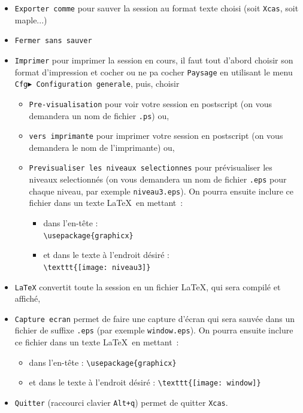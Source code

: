 \documentclass[a4paper,11pt]{article}
\begin{document}
\begin{itemize}
{\tt Sauver tout} pour sauver tout votre espace de travail 
c'est \`a dire toutes les sessions dans un fichier de suffixe {\tt .xws},
\item {\tt Exporter comme} pour sauver la session au format texte choisi (soit 
{\tt Xcas}, soit maple...)
\item
{\tt Fermer sans sauver}
\item 
{\tt Imprimer} pour imprimer la session en cours, il faut tout d'abord choisir 
son format d'impression et cocher ou ne pa cocher {\tt Paysage}  en utilisant 
le menu {\tt Cfg$\blacktriangleright$ Configuration generale}, puis, choisir 
\begin{itemize}
\item {\tt Pre-visualisation} pour voir votre  session en postscript (on vous 
demandera un nom de fichier {\tt .ps}) ou, 
\item {\tt vers imprimante} pour imprimer votre session en postscript (on vous 
demandera le nom de l'imprimante) ou,
\item {\tt Previsualiser les niveaux selectionnes} pour pr\'evisualiser les niveaux selectionn\'es (on vous  
demandera un nom de fichier {\tt .eps} pour chaque niveau, par exemple {\tt niveau3.eps}).
On pourra ensuite inclure ce fichier dans un
texte \LaTeX ~en mettant~:
\begin{itemize}
\item dans l'en-t\^ete :\\
\verb|\usepackage{graphicx} |
\item
et dans le texte \`a l'endroit d\'esir\'e :\\
\verb|\texttt{[image: niveau3]}|
\end{itemize}
\end{itemize}
\item {\tt \LaTeX} convertit toute la session en un fichier \LaTeX, qui sera compil\'e et affich\'e,
\item {\tt Capture ecran} permet de 
faire une capture d'\'ecran qui sera sauv\'ee dans un fichier de suffixe 
{\tt .eps} (par exemple {\tt window.eps}).
On pourra ensuite inclure ce fichier dans un
texte \LaTeX ~en mettant~:
\begin{itemize}
\item dans l'en-t\^ete :
\verb|\usepackage{graphicx} |
\item
et dans le texte \`a l'endroit d\'esir\'e :
\verb|\texttt{[image: window]}|
\end{itemize}
\item
{\tt Quitter} (raccourci clavier {\tt Alt+q}) permet de quitter {\tt Xcas}.
\end{itemize}
\end{document}
